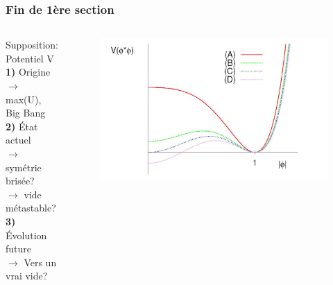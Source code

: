\documentclass[handout]{beamer}
\begin{document}
  \begin{frame}\frametitle{Fin de 1ère section}
  
  
  
\begin{columns}[T]
    \begin{column}[T]{.5\linewidth}
    Supposition: Potentiel V\\[0.5 cm]
    \textbf{1)} Origine $\rightarrow$ max(U), Big Bang\\[0.5 cm]
    \textbf{2)} État actuel 
    \\ $\rightarrow$ symétrie brisée?
    \\ $\rightarrow$ vide métastable? \\[0.5 cm]
	\textbf{3)} Évolution future
	\\ $\rightarrow$ Vers un vrai vide?
	
    \end{column}
    \begin{column}[T]{.5\linewidth}
    \begin{figure}[0.3\textwidth]
    \includegraphics[scale=0.2]{evo_pot.jpg}
    \end{figure}
    
    \end{column}
  \end{columns} 
    \end{frame} 

%    
\end{document}
